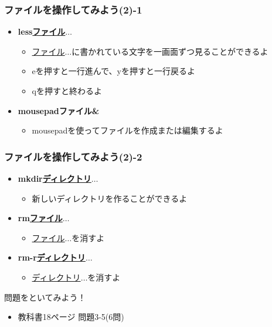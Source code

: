 \documentclass[slide03.tex]{subfiles}
\begin{document}
\begin{frame}
    \frametitle{ファイルを操作してみよう(2)-1}
    \begin{itemize}
        \item {\bf less\textvisiblespace\underline{ファイル}$\ldots$}
        \begin{itemize}
            \small
            \item[] \underline{ファイル}$\ldots$に書かれている文字を一画面ずつ見ることができるよ
            \item[] eを押すと一行進んで、yを押すと一行戻るよ
            \item[] qを押すと終わるよ
        \end{itemize}
        \item {\bf mousepad\textvisiblespace ファイル\textvisiblespace\&}
        \begin{itemize}
            \small
            \item[] mousepadを使ってファイルを作成または編集するよ
        \end{itemize}
    \end{itemize}
\end{frame}

\begin{frame}
    \frametitle{ファイルを操作してみよう(2)-2}
    \begin{itemize}
        \item {\bf mkdir\textvisiblespace\underline{ディレクトリ}$\ldots$}
        \begin{itemize}
            \small
            \item[] 新しいディレクトリを作ることができるよ
        \end{itemize}
        \item {\bf rm\textvisiblespace\underline{ファイル}$\ldots$}
        \begin{itemize}
            \small
            \item[] \underline{ファイル}$\ldots$を消すよ
        \end{itemize}
        \item {\bf rm\textvisiblespace -r\textvisiblespace\underline{ディレクトリ}$\ldots$}
        \begin{itemize}
            \small
            \item[] \underline{ディレクトリ}$\ldots$を消すよ
        \end{itemize}
    \end{itemize}
    \begin{figure}[h]
        \centering
        
    \end{figure}
\end{frame}

\begin{frame}
    \begin{exampleblock}{問題をといてみよう！}
        \begin{itemize}
            \item 教科書18ページ 問題3-5(6問)
            \end{itemize}
    \end{exampleblock}
\end{frame}
\end{document}
